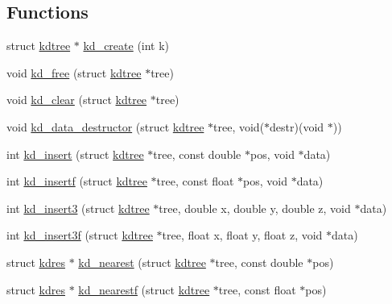 \subsection*{\-Functions}
\begin{DoxyCompactItemize}
\item 
struct \hyperlink{a00011}{kdtree} $\ast$ \hyperlink{a00014_a0267f17ca84a70322af662b16a625c16_a0267f17ca84a70322af662b16a625c16}{kd\-\_\-create} (int k)
\item 
void \hyperlink{a00014_aafdee4d5c129970e12fd9fe6da45d6d1_aafdee4d5c129970e12fd9fe6da45d6d1}{kd\-\_\-free} (struct \hyperlink{a00011}{kdtree} $\ast$tree)
\item 
void \hyperlink{a00014_a354bb35c5b031992cd0972dc53ad5d4f_a354bb35c5b031992cd0972dc53ad5d4f}{kd\-\_\-clear} (struct \hyperlink{a00011}{kdtree} $\ast$tree)
\item 
void \hyperlink{a00014_af2b7a413e4a0daf4add90cf982b954ec_af2b7a413e4a0daf4add90cf982b954ec}{kd\-\_\-data\-\_\-destructor} (struct \hyperlink{a00011}{kdtree} $\ast$tree, void($\ast$destr)(void $\ast$))
\item 
int \hyperlink{a00014_afafddbe0ccd0ca2c41917fb6d79f3392_afafddbe0ccd0ca2c41917fb6d79f3392}{kd\-\_\-insert} (struct \hyperlink{a00011}{kdtree} $\ast$tree, const double $\ast$pos, void $\ast$data)
\item 
int \hyperlink{a00014_ab64899a430280fc8affa205d82d07d10_ab64899a430280fc8affa205d82d07d10}{kd\-\_\-insertf} (struct \hyperlink{a00011}{kdtree} $\ast$tree, const float $\ast$pos, void $\ast$data)
\item 
int \hyperlink{a00014_a354954a360619c49f086402676b36e35_a354954a360619c49f086402676b36e35}{kd\-\_\-insert3} (struct \hyperlink{a00011}{kdtree} $\ast$tree, double x, double y, double z, void $\ast$data)
\item 
int \hyperlink{a00014_a9875b355df53d4545843f7471abb04f4_a9875b355df53d4545843f7471abb04f4}{kd\-\_\-insert3f} (struct \hyperlink{a00011}{kdtree} $\ast$tree, float x, float y, float z, void $\ast$data)
\item 
struct \hyperlink{a00010}{kdres} $\ast$ \hyperlink{a00014_a035f690066c2bd71caf4d38ff367a437_a035f690066c2bd71caf4d38ff367a437}{kd\-\_\-nearest} (struct \hyperlink{a00011}{kdtree} $\ast$tree, const double $\ast$pos)
\item 
struct \hyperlink{a00010}{kdres} $\ast$ \hyperlink{a00014_a62c3e2c5f4ee976a504d9e54080e332d_a62c3e2c5f4ee976a504d9e54080e332d}{kd\-\_\-nearestf} (struct \hyperlink{a00011}{kdtree} $\ast$tree, const float $\ast$pos)

\end{DoxyCompactItemize}
